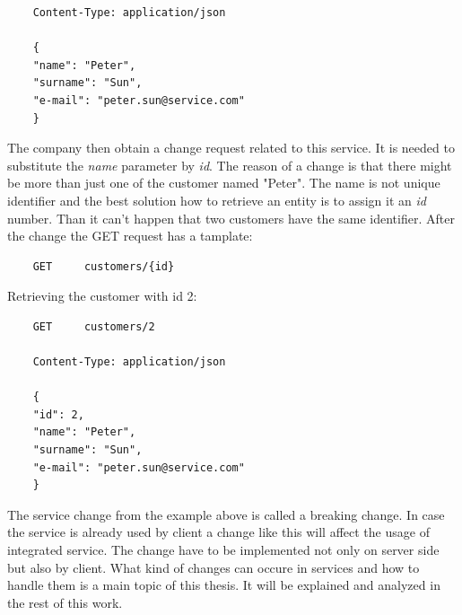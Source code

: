 \begin{lstlisting}
    Content-Type: application/json
    
    { 
    "name": "Peter",
    "surname": "Sun",
    "e-mail": "peter.sun@service.com" 
    }
\end{lstlisting}

The company then obtain a change request related to this service. It is needed to substitute the \emph{name} parameter by \emph{id}. The reason of a change is that there might be more than just one of the customer named "Peter". The name is not unique identifier and the best solution how to retrieve an entity is to assign it an \emph{id} number. Than it can't happen that two customers have the same identifier. After the change the GET request has a tamplate:
\begin{lstlisting}
    GET     customers/{id} 
\end{lstlisting}

Retrieving the customer with id 2:

\begin{lstlisting}
    GET     customers/2 
    
    Content-Type: application/json
    
    { 
    "id": 2,
    "name": "Peter",
    "surname": "Sun",
    "e-mail": "peter.sun@service.com" 
    }
\end{lstlisting}


The service change from the example above is called a breaking change. In case the service is already used by client a change like this will affect the usage of integrated service. The change have to be implemented not only on server side but also by client. What kind of changes can occure in services and how to handle them is a main topic of this thesis. It will be explained and analyzed in the rest of this work.
